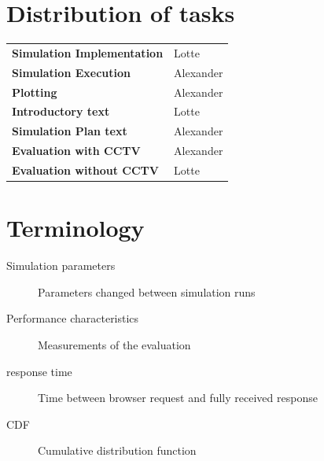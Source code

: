 \documentclass[
10pt, %
a4paper, %
oneside, %
headinclude,footinclude, %
BCOR5mm, %
]{scrartcl}
\begin{document}
\newpage

\section{Distribution of tasks}

\begin{table}[H]
\begin{tabularx}{\textwidth}{ l l }
  \textbf{Simulation Implementation} & Lotte \\
  \textbf{Simulation Execution} & Alexander \\
  \textbf{Plotting} & Alexander \\
  \textbf{Introductory text} & Lotte \\
  \textbf{Simulation Plan text} & Alexander \\
  \textbf{Evaluation with CCTV} & Alexander \\
  \textbf{Evaluation without CCTV} & Lotte \\
\end{tabularx}
\end{table}

\section{Terminology}
\begin{description}
\item[Simulation parameters] Parameters changed between simulation runs
\item[Performance characteristics] Measurements of the evaluation
\item[response time] Time between browser request and fully received response
\item[CDF] Cumulative distribution function
\end{description}

\listoffigures %

\listoftables %



\renewcommand{\refname}{\spacedlowsmallcaps{References}} %




\end{document}
